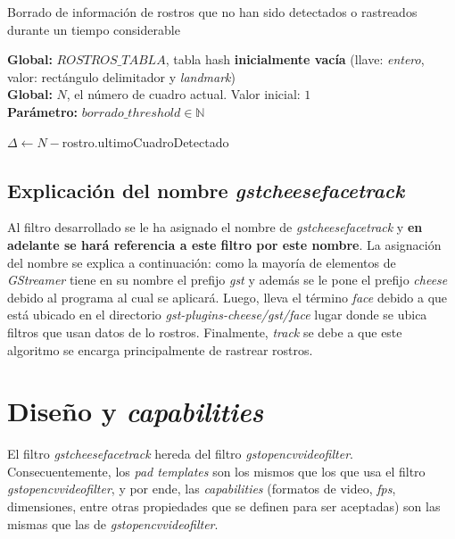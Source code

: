 \documentclass[a4paper,openright,12pt]{report}
\begin{document}
\begin{algorithm}
  \caption{Borrado de información de rostros que no han sido detectados o
      rastreados durante un tiempo considerable}
  \label{alg:delete}
  \textbf{Global: }$ROSTROS\_TABLA$, tabla hash \textbf{inicialmente vacía}
      (llave: \textit{entero}, valor: rectángulo delimitador y \textit{landmark})\\
  \textbf{Global: }$N$, el número de cuadro actual. Valor inicial: $1$\\
  \textbf{Parámetro: }$borrado\_threshold \in \mathbb{N}$\\
  \begin{algorithmic}[1]
        \State $\Delta\gets N - $rostro.ultimoCuadroDetectado
          \State {}
        \EndIf
      \EndFor
    \EndProcedure
  \end{algorithmic}
\end{algorithm}

\subsection{Explicación del nombre \textit{gstcheesefacetrack}}
Al filtro desarrollado se le ha asignado el nombre de
\textit{gstcheesefacetrack} y \textbf{en adelante se hará referencia a este
filtro por este nombre}. La asignación del nombre se explica a continuación:
como la mayoría de elementos de \textit{GStreamer} tiene en su nombre el prefijo
\textit{gst} y además se le pone el prefijo \textit{cheese} debido al programa
al cual se aplicará. Luego, lleva el término \textit{face} debido a que está
ubicado en el directorio \textit{gst-plugins-cheese/gst/face} lugar donde se
ubica filtros que usan datos de lo rostros. Finalmente, \textit{track} se debe
a que este algoritmo se encarga principalmente de rastrear rostros.

\section{Diseño y \textit{capabilities}}
El filtro \textit{gstcheesefacetrack} hereda del filtro
\textit{\gls{gstopencvvideofilter}}. Consecuentemente, los \textit{pad templates} son
los mismos que los que usa el filtro \textit{\gls{gstopencvvideofilter}}, y por ende,
las \textit{capabilities} (formatos de video, \textit{fps}, dimensiones, entre
otras propiedades que se definen para ser aceptadas) son las mismas que las de
\textit{\gls{gstopencvvideofilter}}.\\
\end{document}
